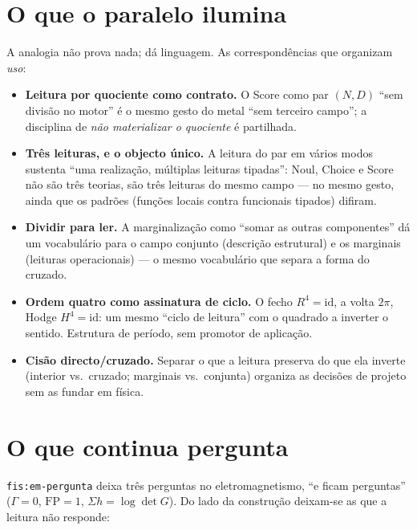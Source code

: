 \documentclass[11pt,a4paper]{article}
\begin{document}
\section{O que o paralelo ilumina}\label{sec:ilumina}

A analogia não prova nada; dá linguagem. As correspondências que organizam
\emph{uso}:

\begin{itemize}[leftmargin=1.5em]
\item \textbf{Leitura por quociente como contrato.} O Score como par $(N,D)$
      ``sem divisão no motor'' é o mesmo gesto do metal ``sem terceiro campo'';
      a disciplina de \emph{não materializar o quociente} é partilhada.
\item \textbf{Três leituras, e o objecto único.} A leitura do par em vários
      modos sustenta ``uma realização, múltiplas leituras tipadas'': Noul,
      Choice e Score não são três teorias, são três leituras do mesmo campo
      --- no mesmo gesto, ainda que os padrões (funções locais contra
      funcionais tipados) difiram.
\item \textbf{Dividir para ler.} A marginalização como ``somar as outras
      componentes'' dá um vocabulário para o campo conjunto (descrição
      estrutural) e os marginais (leituras operacionais) --- o mesmo
      vocabulário que separa a forma do cruzado.
\item \textbf{Ordem quatro como assinatura de ciclo.} O fecho $R^{4}=\mathrm{id}$,
      a volta $2\pi$, Hodge $H^{4}=\mathrm{id}$: um mesmo ``ciclo de leitura''
      com o quadrado a inverter o sentido. Estrutura de período, sem promotor de
      aplicação.
\item \textbf{Cisão directo/cruzado.} Separar o que a leitura preserva do que
      ela inverte (interior vs.\ cruzado; marginais vs.\ conjunta) organiza as
      decisões de projeto sem as fundar em física.
\end{itemize}

\section{O que continua pergunta}\label{sec:perguntas}

\noindent \texttt{fis:em-pergunta} deixa três perguntas no eletromagnetismo,
``e ficam perguntas'' ($\Gamma=0$, $\mathrm{FP}=1$, $\Sigma h=\log\det G$). Do
lado da construção deixam-se as que a leitura não responde:
\end{document}
